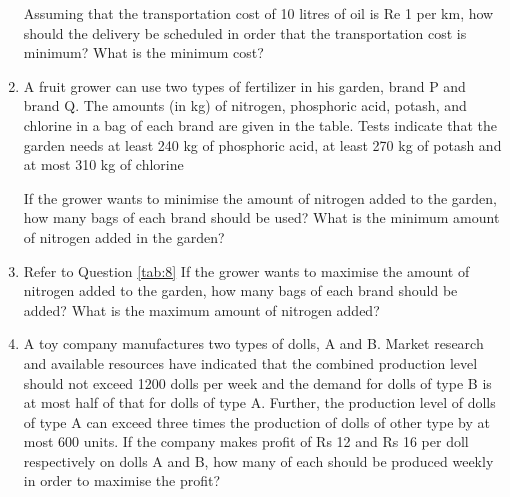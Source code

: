 \begin{enumerate}[label=\thesection.\arabic*,ref=\thesection.\theenumi]
Assuming that the transportation cost of 10 litres of oil is Re 1 per km, how should the delivery be scheduled in order that the transportation cost is minimum? What is the minimum cost?

\label{12/12/3/7}
%
\item A fruit grower can use two types of fertilizer in his garden, brand P and brand Q. The amounts (in kg) of nitrogen, phosphoric acid, potash, and chlorine in a bag of each brand are given in the table. Tests indicate that the garden needs at least 240 kg of phosphoric acid, at least 270 kg of potash and at most 310 kg of chlorine

If the grower wants to minimise the amount of nitrogen added to the garden, how many bags of each brand should be used? What is the minimum amount of nitrogen added in the garden?

\begin{table}[h]
\centering

\caption{}
\label{tab:8}
\end{table}
\label{12/12/3/8}
\solution


\item Refer to Question \ref{tab:8} If the grower wants to maximise the amount of nitrogen added to the garden, how many bags of each brand should be added? What is the maximum amount of nitrogen added?
\label{12/12/3/9}
%

\item A toy company manufactures two types of dolls, A and B. Market research and available resources have indicated that the combined production level should not exceed 1200 dolls per week and the demand for dolls of type B is at most half of that for dolls of type A. Further, the production level of dolls of type A can exceed three times the production of dolls of other type by at most 600 units. If the company makes profit of Rs 12 and Rs 16 per doll respectively on dolls A and B, how many of each should be produced weekly in order to maximise the profit?
\label{12/12/3/10}
%

\end{enumerate}
